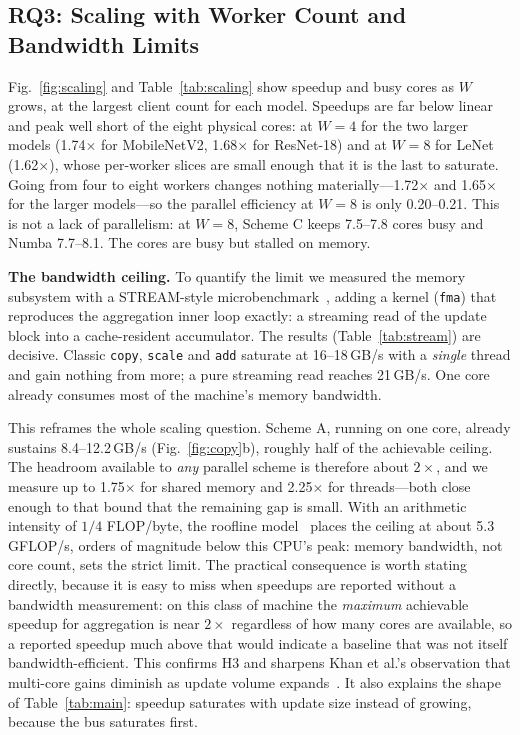 \documentclass[conference]{IEEEtran}
\begin{document}
\subsection{RQ3: Scaling with Worker Count and Bandwidth Limits}
\label{sec:rq3}
Fig.~\ref{fig:scaling} and Table~\ref{tab:scaling} show speedup and busy cores as $W$ grows, at the largest client count for each model. Speedups are far below linear and peak well short of the eight physical cores: at $W=4$ for the two larger models (1.74$\times$ for MobileNetV2, 1.68$\times$ for ResNet-18) and at $W=8$ for LeNet (1.62$\times$), whose per-worker slices are small enough that it is the last to saturate. Going from four to eight workers changes nothing materially---1.72$\times$ and 1.65$\times$ for the larger models---so the parallel efficiency at $W=8$ is only 0.20--0.21. This is not a lack of parallelism: at $W=8$, Scheme C keeps 7.5--7.8 cores busy and Numba 7.7--8.1. The cores are busy but stalled on memory.

\textbf{The bandwidth ceiling.} To quantify the limit we measured the memory subsystem with a STREAM-style microbenchmark~\cite{stream}, adding a kernel (\texttt{fma}) that reproduces the aggregation inner loop exactly: a streaming read of the update block into a cache-resident accumulator. The results (Table~\ref{tab:stream}) are decisive. Classic \texttt{copy}, \texttt{scale} and \texttt{add} saturate at 16--18\,GB/s with a \emph{single} thread and gain nothing from more; a pure streaming read reaches 21\,GB/s. One core already consumes most of the machine's memory bandwidth.

This reframes the whole scaling question. Scheme A, running on one core, already sustains 8.4--12.2\,GB/s (Fig.~\ref{fig:copy}b), roughly half of the achievable ceiling. The headroom available to \emph{any} parallel scheme is therefore about $2\times$, and we measure up to 1.75$\times$ for shared memory and 2.25$\times$ for threads---both close enough to that bound that the remaining gap is small. With an arithmetic intensity of $1/4$ FLOP/byte, the roofline model~\cite{roofline} places the ceiling at about 5.3\,GFLOP/s, orders of magnitude below this CPU's peak: memory bandwidth, not core count, sets the strict limit. The practical consequence is worth stating directly, because it is easy to miss when speedups are reported without a bandwidth measurement: on this class of machine the \emph{maximum} achievable speedup for aggregation is near $2\times$ regardless of how many cores are available, so a reported speedup much above that would indicate a baseline that was not itself bandwidth-efficient. This confirms H3 and sharpens Khan et al.'s observation that multi-core gains diminish as update volume expands~\cite{khan2023}. It also explains the shape of Table~\ref{tab:main}: speedup saturates with update size instead of growing, because the bus saturates first.
\end{document}
